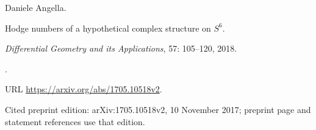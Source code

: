 Daniele Angella.

\newblock Hodge numbers of a hypothetical complex structure on {$S^6$}.

\newblock \emph{Differential Geometry and its Applications}, 57:
  105--120, 2018.

\newblock {}.

\newblock URL \url{https://arxiv.org/abs/1705.10518v2}.

\newblock Cited preprint edition: arXiv:1705.10518v2, 10 November 2017; preprint page and statement references use that edition.
